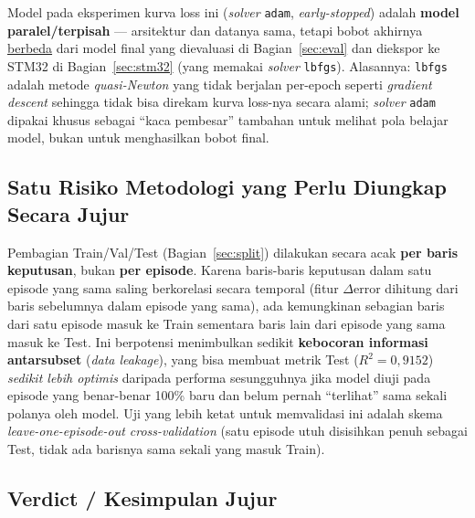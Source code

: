 \documentclass[11pt,a4paper]{article}
\begin{document}
\begin{notebox}
Model pada eksperimen kurva loss ini (\emph{solver} \texttt{adam}, \emph{early-stopped})
adalah \textbf{model paralel/terpisah} --- arsitektur dan datanya sama, tetapi bobot
akhirnya \underline{berbeda} dari model final yang dievaluasi di Bagian~\ref{sec:eval}
dan diekspor ke STM32 di Bagian~\ref{sec:stm32} (yang memakai \emph{solver}
\texttt{lbfgs}). Alasannya: \texttt{lbfgs} adalah metode \emph{quasi-Newton} yang tidak
berjalan per-epoch seperti \emph{gradient descent} sehingga tidak bisa direkam kurva
loss-nya secara alami; \emph{solver} \texttt{adam} dipakai khusus sebagai ``kaca
pembesar'' tambahan untuk melihat pola belajar model, bukan untuk menghasilkan bobot
final.
\end{notebox}

\subsection{Satu Risiko Metodologi yang Perlu Diungkap Secara Jujur}

Pembagian Train/Val/Test (Bagian~\ref{sec:split}) dilakukan secara acak \textbf{per baris
keputusan}, bukan \textbf{per episode}. Karena baris-baris keputusan dalam satu episode
yang sama saling berkorelasi secara temporal (fitur $\Delta\mathrm{error}$ dihitung dari
baris sebelumnya dalam episode yang sama), ada kemungkinan sebagian baris dari satu
episode masuk ke Train sementara baris lain dari episode yang sama masuk ke Test. Ini
berpotensi menimbulkan sedikit \textbf{kebocoran informasi antarsubset} (\emph{data
leakage}), yang bisa membuat metrik Test ($R^2=0{,}9152$) \emph{sedikit lebih optimis}
daripada performa sesungguhnya jika model diuji pada episode yang benar-benar 100\% baru
dan belum pernah ``terlihat'' sama sekali polanya oleh model. Uji yang lebih ketat untuk
memvalidasi ini adalah skema \emph{leave-one-episode-out cross-validation} (satu episode
utuh disisihkan penuh sebagai Test, tidak ada barisnya sama sekali yang masuk Train).

\subsection{Verdict / Kesimpulan Jujur}
\end{document}
